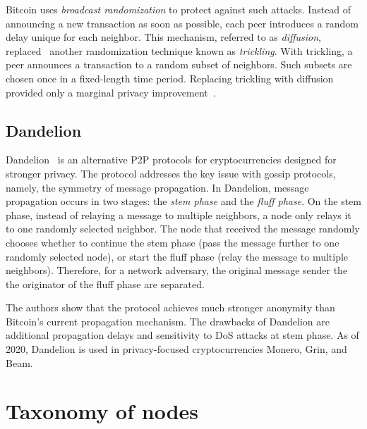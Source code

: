 Bitcoin uses \textit{broadcast randomization} to protect against such attacks.
Instead of announcing a new transaction as soon as possible, each peer introduces a random delay unique for each neighbor.
This mechanism, referred to as \textit{diffusion}, replaced~\cite{Wuille} another randomization technique known as \textit{trickling}.
With trickling, a peer announces a transaction to a random subset of neighbors.
Such subsets are chosen once in a fixed-length time period.
Replacing trickling with diffusion provided only a marginal privacy improvement~\cite{Fanti2017}.



\subsection{Dandelion}
\label{sec:Dandelion}

Dandelion~\cite{Venkatakrishnan2017, Fanti2018} is an alternative P2P protocols for cryptocurrencies designed for stronger privacy.
The protocol addresses the key issue with gossip protocols, namely, the symmetry of message propagation.
In Dandelion, message propagation occurs in two stages: the \textit{stem phase} and the \textit{fluff phase}.
On the stem phase, instead of relaying a message to multiple neighbors, a node only relays it to one randomly selected neighbor.
The node that received the message randomly chooses whether to continue the stem phase (pass the message further to one randomly selected node), or start the fluff phase (relay the message to multiple neighbors).
Therefore, for a network adversary, the original message sender the the originator of the fluff phase are separated.

The authors show that the protocol achieves much stronger anonymity than Bitcoin's current propagation mechanism.
The drawbacks of Dandelion are additional propagation delays and sensitivity to DoS attacks at stem phase.
As of 2020, Dandelion is used in privacy-focused cryptocurrencies Monero, Grin, and Beam.


\section{Taxonomy of nodes}

